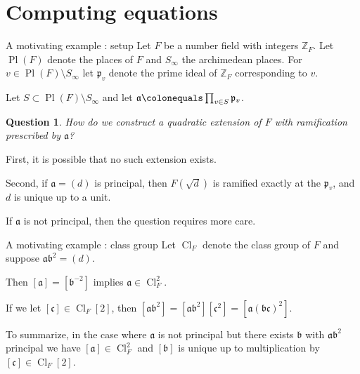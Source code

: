 \documentclass[xcolor=dvipsnames,handout]{beamer}
\theoremstyle{plain}
\newtheorem*{ques}{Question}
\newcommand{\ZZ}{\mathbb Z}
\DeclareMathOperator{\Pl}{Pl}
\DeclareMathOperator{\Cl}{Cl}
\begin{document}
  \section{Computing equations}{
    \begin{frame}{A motivating example : setup}
      Let $F$ be a number field with
      integers $\ZZ_F$.
      Let $\Pl(F)$ denote the places of $F$
      and $S_\infty$ the archimedean places.
      For $v\in\Pl(F)\setminus S_\infty$ let
      $\mathfrak{p}_v$ denote the prime ideal
      of $\ZZ_F$ corresponding to $v$.
      \pause\par
      Let $S\subset\Pl(F)\setminus S_\infty$ and let
      $\mathfrak{a} \colonequals\prod_{v\in S}\mathfrak{p}_v$.
      \pause\par
      \begin{ques}
        \vspace{1pt}
        How do we construct a quadratic extension of $F$
        with ramification prescribed by $\mathfrak{a}$?
      \end{ques}
      \pause
      First, it is possible that no such extension exists.
      \pause\par
      Second, if $\mathfrak{a}=(d)$ is principal,
      then $F(\sqrt{d})$ is ramified exactly at
      the $\mathfrak{p}_v$, and $d$ is unique up
      to a unit.
      \pause\par
      If $\mathfrak{a}$ is not principal,
      then the question requires more care.
    \end{frame}
    \begin{frame}{A motivating example : class group}
      Let $\Cl_F$ denote the class group of $F$
      and suppose $\mathfrak{a}\mathfrak{b}^2=(d)$.
      \pause\par
      Then
      $[\mathfrak{a}]=[\mathfrak{b}^{-2}]$
      implies $\mathfrak{a}\in\Cl_F^2$.
      \pause\par
      If we let $[\mathfrak{c}]\in\Cl_F[2]$,
      then
      $[\mathfrak{a}\mathfrak{b}^2]
        =[\mathfrak{a}\mathfrak{b}^2][\mathfrak{c}^2]
        =[\mathfrak{a}(\mathfrak{b}\mathfrak{c})^2]$.
      \pause\par
      To summarize,
      in the case where $\mathfrak{a}$ is not principal
      but there exists $\mathfrak{b}$ with
      $\mathfrak{a}\mathfrak{b}^2$ principal
      we have
      $[\mathfrak{a}]\in\Cl_F^2$
      and $[\mathfrak{b}]$ is unique
      up to multiplication by
      $[\mathfrak{c}]\in\Cl_F[2]$.
      \pause\par

\end{frame}}
\end{document}
